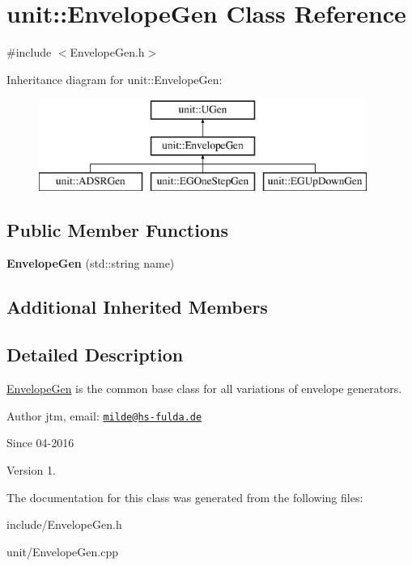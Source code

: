 \hypertarget{classunit_1_1EnvelopeGen}{}\section{unit\+:\+:Envelope\+Gen Class Reference}
\label{classunit_1_1EnvelopeGen}


{\ttfamily \#include $<$Envelope\+Gen.\+h$>$}

Inheritance diagram for unit\+:\+:Envelope\+Gen\+:\begin{figure}[H]
\begin{center}
\leavevmode
\includegraphics[height=3.000000cm]{classunit_1_1EnvelopeGen}
\end{center}
\end{figure}
\subsection*{Public Member Functions}
\begin{DoxyCompactItemize}
\item 
{\bfseries Envelope\+Gen} (std\+::string name)\hypertarget{classunit_1_1EnvelopeGen_a2925f305c08e3316c3b1cbdabea03bde}{}\label{classunit_1_1EnvelopeGen_a2925f305c08e3316c3b1cbdabea03bde}

\end{DoxyCompactItemize}
\subsection*{Additional Inherited Members}


\subsection{Detailed Description}
\hyperlink{classunit_1_1EnvelopeGen}{Envelope\+Gen} is the common base class for all variations of envelope generators.

\begin{DoxyAuthor}{Author}
jtm, email\+:  \href{mailto:milde@hs-fulda.de}{\tt milde@hs-\/fulda.\+de} 
\end{DoxyAuthor}
\begin{DoxySince}{Since}
04-\/2016 
\end{DoxySince}
\begin{DoxyVersion}{Version}
1. 
\end{DoxyVersion}


The documentation for this class was generated from the following files\+:\begin{DoxyCompactItemize}
\item 
include/Envelope\+Gen.\+h\item 
unit/Envelope\+Gen.\+cpp\end{DoxyCompactItemize}
